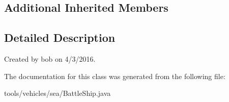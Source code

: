 \subsection*{Additional Inherited Members}


\subsection{Detailed Description}
Created by bob on 4/3/2016. 

The documentation for this class was generated from the following file\+:\begin{DoxyCompactItemize}
\item 
tools/vehicles/sea/Battle\+Ship.\+java\end{DoxyCompactItemize}
